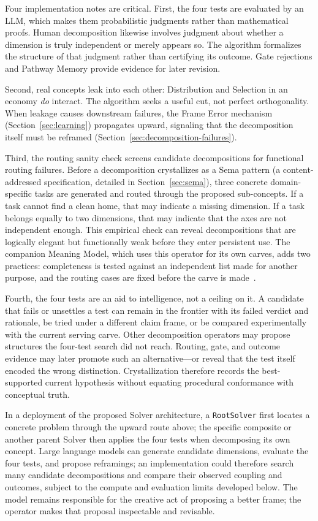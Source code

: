\documentclass[11pt]{article}
\let\oldtexttt\texttt
\renewcommand{\texttt}[1]{\oldtexttt{\small #1}}
\begin{document}
Four implementation notes are critical. First, the four tests
are evaluated by an LLM, which makes them probabilistic judgments rather
than mathematical proofs. Human decomposition likewise involves judgment
about whether a dimension is truly independent or merely appears so. The
algorithm formalizes the structure of that judgment rather than certifying
its outcome. Gate rejections and Pathway Memory provide evidence for later
revision.

Second, real concepts leak into each other: Distribution and Selection in an
economy \emph{do} interact. The algorithm seeks a useful cut, not perfect
orthogonality. When leakage causes downstream failures, the Frame Error mechanism
(Section~\ref{sec:learning}) propagates upward, signaling that the
decomposition itself must be reframed (Section~\ref{sec:decomposition-failures}).

Third, the routing sanity check screens candidate decompositions for
functional routing failures. Before a decomposition crystallizes as a Sema pattern (a content-addressed specification, detailed in Section~\ref{sec:sema}),
three concrete domain-specific tasks are generated and routed through
the proposed sub-concepts. If a task cannot find a clean home, that may
indicate a missing dimension. If a task belongs equally to two dimensions,
that may indicate that the axes are not independent enough. This empirical check can reveal
decompositions that are logically elegant but functionally weak before
they enter persistent use. The companion Meaning Model, which uses this operator for its own carves, adds two practices: completeness is tested against an independent list made for another purpose, and the routing cases are fixed before the carve is made~\cite{westerberg2026meaningmodel}.

Fourth, the four tests are an aid to intelligence, not a ceiling on it. A
candidate that fails or unsettles a test can remain in the frontier with its
failed verdict and rationale, be tried under a different claim frame, or be
compared experimentally with the current serving carve. Other decomposition
operators may propose structures the four-test search did not reach. Routing,
gate, and outcome evidence may later promote such an alternative---or reveal
that the test itself encoded the wrong distinction. Crystallization therefore
records the best-supported current hypothesis without equating procedural
conformance with conceptual truth.

In a deployment of the proposed Solver architecture, a \texttt{RootSolver}
first locates a concrete problem through the upward route above; the specific
composite or another parent Solver then applies the four tests when decomposing
its own concept. Large language models can generate candidate dimensions,
evaluate the four tests, and propose reframings; an implementation could
therefore search many candidate decompositions and compare their observed
coupling and outcomes, subject to the compute and evaluation limits developed
below. The model remains responsible for the creative act of proposing a
better frame; the operator makes that proposal inspectable and revisable.
\end{document}
